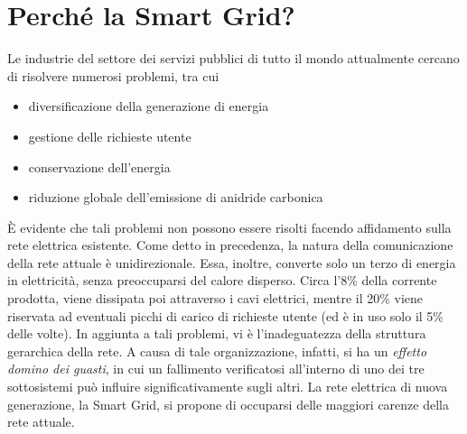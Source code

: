 \section{Perché la Smart Grid?}
Le industrie del settore dei servizi pubblici di tutto il mondo attualmente cercano di risolvere numerosi problemi, tra cui 
\begin{itemize}
\item diversificazione della generazione di energia
\item gestione delle richieste utente
\item conservazione dell'energia
\item riduzione globale dell'emissione di anidride carbonica
\end{itemize}
È evidente che tali problemi non possono essere risolti facendo affidamento sulla rete elettrica esistente. \newline
Come detto in precedenza, la natura della comunicazione della rete attuale è unidirezionale. Essa, inoltre, converte solo un terzo di energia in elettricità, senza preoccuparsi del calore disperso. Circa l'8\% della corrente prodotta, viene dissipata poi attraverso i cavi elettrici, mentre il 20\% viene riservata ad eventuali picchi di carico di richieste utente (ed è in uso solo il 5\% delle volte). \newline
In aggiunta a tali problemi, vi è l'inadeguatezza della struttura gerarchica della rete. A causa di tale organizzazione, infatti, si ha un \textit{effetto domino dei guasti}, in cui un fallimento verificatosi all'interno di uno dei tre sottosistemi può influire significativamente sugli altri. \newline
La rete elettrica di nuova generazione, la Smart Grid, si propone di occuparsi delle maggiori carenze della rete attuale.
\begin{figure}[h]
\end{figure}

